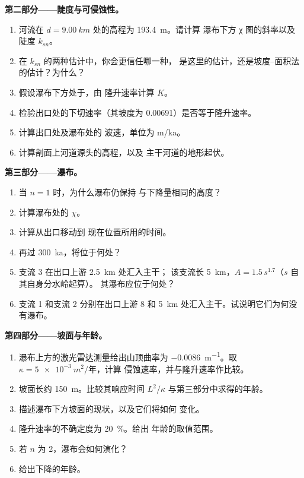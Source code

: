 \begin{problem}
\medskip\noindent\textbf{第二部分——陡度与可侵蚀性。}
\begin{enumerate}[resume]
\item 河流在 $d = \qty{9.00}{km}$ 处的高程为 \qty{193.4}{m}。请计算
  瀑布下方 χ 图的斜率以及陡度 $k_{sn}$。
\item 在 $k_{sn}$ 的两种估计中，你会更信任哪一种，
  是这里的估计，还是坡度–面积法的估计？为什么？
\item 假设瀑布下方处于，由
  隆升速率计算 $K$。
\item 检验出口处的下切速率（其坡度为
  0.00691）是否等于隆升速率。
\item 计算出口处及瀑布处的
  波速，单位为 m/ka。
\item 计算剖面上河道源头的高程，以及
  主干河道的地形起伏。
\end{enumerate}

\medskip\noindent\textbf{第三部分——瀑布。}
\begin{enumerate}[resume]
\item 当 $n = 1$ 时，为什么瀑布仍保持
  与下降量相同的高度？
\item 计算瀑布处的 $\chi$。
\item 计算从出口移动到
  现在位置所用的时间。
\item 再过 \qty{300}{ka}，将位于何处？
\item 支流 3 在出口上游 \qty{2.5}{km} 处汇入主干；
  该支流长 \qty{5}{km}，$A = 1.5\,s^{1.7}$（$s$ 自其自身分水岭起算）。
  其瀑布应位于何处？
\item 支流 1 和支流 2 分别在出口上游 8 和 \qty{5}{km}
  处汇入主干。试说明它们为何没有瀑布。
\end{enumerate}

\medskip\noindent\textbf{第四部分——坡面与年龄。}
\begin{enumerate}[resume]
\item 瀑布上方的激光雷达测量给出山顶曲率为
  \qty{-0.0086}{m^{-1}}。取 $\kappa = \qty{5e-3}{m^2/\text{年}}$，计算
  侵蚀速率，并与隆升速率作比较。
\item 坡面长约 \qty{150}{m}。比较其响应时间
  $L^2/\kappa$ 与第三部分中求得的年龄。
\item 描述瀑布下方坡面的现状，以及它们将如何
  变化。
\item 隆升速率的不确定度为 \qty{20}{\percent}。给出
  年龄的取值范围。
\item 若 $n$ 为 2，瀑布会如何演化？
\item 给出下降的年龄。
\end{enumerate}
\end{problem}
